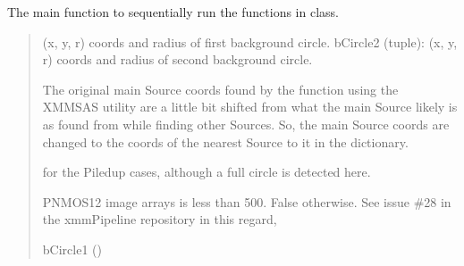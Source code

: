 \documentclass[letterpaper,10pt,english]{sphinxmanual}
\begin{document}
\begin{fulllineitems}
\begin{fulllineitems}
\end{fulllineitems}


\begin{fulllineitems}
\label{\detokenize{xmmPipeline:xmmPipeline.findOverlap.findOverlap.main}}
\pysigstartsignatures
{}
\pysigstopsignatures
\sphinxAtStartPar
The main function to sequentially run the functions in  class.
\begin{quote}\begin{description}
\sphinxAtStartPar

\sphinxAtStartPar
(x, y, r) coords and radius of first background circle.
bCircle2 (tuple): (x, y, r) coords and radius of second background circle.
\begin{description}
\sphinxAtStartPar
The original main Source coords found by the 
function using the XMMSAS  utility are a little bit shifted
from what the main Source likely is as found from  while
finding other Sources. So, the main Source coords are changed to the coords
of the nearest Source to it in the  dictionary.

\sphinxAtStartPar
for the Piled\sphinxhyphen{}up cases, although a full circle is detected here.

\sphinxAtStartPar
PNMOS12 image arrays is less than 500. False otherwise.
See issue \#28 in the xmmPipeline repository in this regard,

\end{description}


\sphinxAtStartPar
bCircle1 ()

\end{description}\end{quote}

\end{fulllineitems}
\end{fulllineitems}
\end{document}
